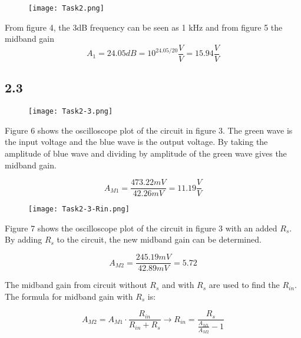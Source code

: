     \begin{figure}[h!]
        \centering
        \texttt{[image: Task2.png]}
    \end{figure}

From figure 4, the 3dB frequency can be seen as 1 kHz and from figure 5 the midband gain $$A_1 = 24.05 dB = 10^{24.05/20} \frac{V}{V} = 15.94 \frac{V}{V}$$


\pagebreak
\subsection*{2.3}

    \begin{figure}[h!]
        \centering
        \texttt{[image: Task2-3.png]}
    \end{figure}

	Figure 6 shows the oscilloscope plot of the circuit in figure 3. The green wave is the input voltage and the blue wave is the output voltage. By taking the amplitude of blue wave and dividing by amplitude of the green wave gives the midband gain.

	$$ A_{M1} = \frac{473.22 mV}{42.26 mV} = 11.19 \frac{V}{V} $$

\pagebreak

    \begin{figure}[h!]
        \centering
        \texttt{[image: Task2-3-Rin.png]}
    \end{figure}

	Figure 7 shows the oscilloscope plot of the circuit in figure 3 with an added $R_{s}$. By adding $R_{s}$ to the circuit, the new midband gain can be determined.

	$$ A_{M2} = \frac{245.19 mV}{42.89 mV} = 5.72 $$

	The midband gain from circuit without $R_{s}$ and with $R_{s}$ are used to find the $R_{in}$. The formula for midband gain with $R_{s}$ is:  

	$$A_{M2} = A_{M1} \cdot \frac{R_{in}}{R_{in} + R_{s}} \rightarrow R_{in} = \frac{R_{s}}{\frac{A_{M1}}{A_{M2}}-1}  $$

